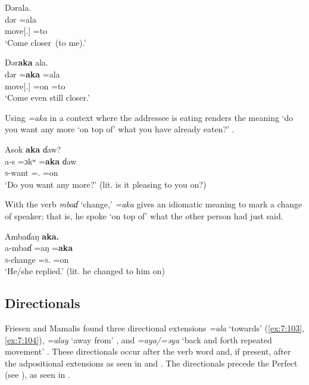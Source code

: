 \ea\label{ex:7:99}
Dərala.\\
\gll  dər       =ala\\
      move[{\twoS}.{\IMP}]   =to\\
\glt  ‘Come closer~(to me).’\\
\z 

\ea\label{ex:7:100}
Dər\textbf{aka}  ala.\\
\gll  dər       =\textbf{aka}   =ala\\
      move[{\twoS}.{\IMP}]   =on   =to\\
\glt  ‘Come even still closer.’\\
\z 

Using \textit{=aka} in a context where the addressee is eating renders the meaning ‘do you want any more ‘on top of’ what you have already eaten?’ .

\ea\label{ex:7:101}
Asok  \textbf{aka}  ɗaw?~\\
\gll  a-s    =ɔkʷ   =\textbf{aka}  ɗaw\\
      \textsc{s}-want  ={\twoS}.{\IO}  =on   {\QUEST}\\
\glt  ‘Do you want any more?’ (lit. is it pleasing to you on?)\\
\z 

With the verb \textit{mbaɗ}  ‘change,’ \textit{=aka} gives an idiomatic meaning to mark a change of speaker; that is, he spoke ‘on top of’ what the other person had just said.

\ea\label{ex:7:102}
Ambaɗaŋ  \textbf{aka.}\\
\gll  a-mbaɗ  =aŋ   =\textbf{aka}\\
      \textsc{s}-change  =\textsc{s}.{\IO}   =on\\
\glt  ‘He/she replied.’ (lit. he changed to him on)\\
\z {}
\subsection{Directionals}\label{sec:7.5.2}
\hypertarget{RefHeading1212361525720847}{}
Friesen and Mamalis found three directional extensions \textit{=ala} ‘towards’ (\ref{ex:7:103}, \ref{ex:7:104}), \textit{=alay} ‘away from’ , and \textit{=aya/=əya} ‘back and forth repeated movement’ . These directionals occur after the verb word and, if present, after the adpositional extensions as seen in  and .  The directionals precede the Perfect (see ), as seen in .


